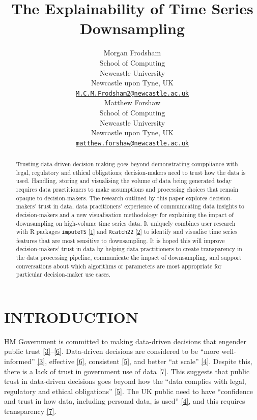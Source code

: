 \documentclass{article}
\title{The Explainability of Time Series Downsampling}
\author{
    Morgan Frodsham
   \\
    School of Computing \\
    Newcastle University \\
  Newcastle upon Tyne, UK \\
  \texttt{\href{mailto:M.C.M.Frodsham2@newcastle.ac.uk}{\nolinkurl{M.C.M.Frodsham2@newcastle.ac.uk}}} \\
   \And
    Matthew Forshaw
   \\
    School of Computing \\
    Newcastle University \\
  Newcastle upon Tyne, UK \\
  \texttt{\href{mailto:matthew.forshaw@newcastle.ac.uk}{\nolinkurl{matthew.forshaw@newcastle.ac.uk}}} \\
  }
\begin{document}
\maketitle


\begin{abstract}
Trusting data-driven decision-making goes beyond demonstrating
comppliance with legal, regulatory and ethical obligations;
decision-makers need to trust how the data is used. Handling, storing
and visualising the volume of data being generated today requires data
practitioners to make assumptions and processing choices that remain
opaque to decision-makers. The research outlined by this paper explores
decision-makers' trust in data, data pracitioners' experience of
communicating data insights to decision-makers and a new visualisation
methodology for explaining the impact of downsampling on high-volume
time series data. It uniquely combines user research with R packages
\texttt{imputeTS} \protect\hyperlink{ref-imputeTS_R}{{[}1{]}} and
\texttt{Rcatch22} \protect\hyperlink{ref-catch22_R}{{[}2{]}} to identify
and visualise time series features that are most sensitive to
downsampling. It is hoped this will improve decision-makers' trust in
data by helping data practitioners to create transparency in the data
processing pipeline, communicate the impact of downsampling, and support
conversations about which algorithms or parameters are most appropriate
for particular decision-maker use cases.
\end{abstract}


\hypertarget{introduction}{%
\section{INTRODUCTION}\label{introduction}}

HM Government is committed to making data-driven decisions that engender
public trust
\protect\hyperlink{ref-data2017}{{[}3{]}}--\protect\hyperlink{ref-data2022}{{[}6{]}}.
Data-driven decisions are considered to be ``more well-informed''
\protect\hyperlink{ref-data2017}{{[}3{]}}, effective
\protect\hyperlink{ref-data2022}{{[}6{]}}, consistent
\protect\hyperlink{ref-data2021}{{[}5{]}}, and better ``at scale''
\protect\hyperlink{ref-data2020}{{[}4{]}}. Despite this, there is a lack
of trust in government use of data
\protect\hyperlink{ref-trust}{{[}7{]}}. This suggests that public trust
in data-driven decisions goes beyond how the ``data complies with legal,
regulatory and ethical obligations''
\protect\hyperlink{ref-data2021}{{[}5{]}}. The UK public need to have
``confidence and trust in how data, including personal data, is used''
\protect\hyperlink{ref-data2020}{{[}4{]}}, and this requires
transparency \protect\hyperlink{ref-trust}{{[}7{]}}.
\end{document}
